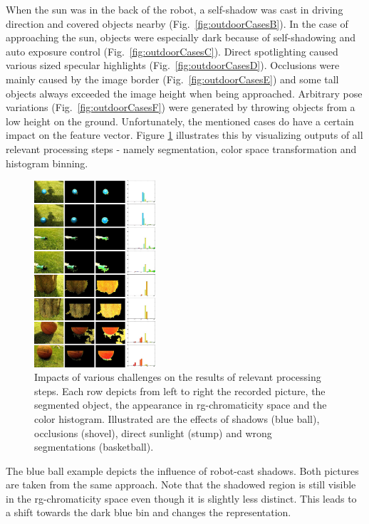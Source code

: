 \documentclass[conference]{IEEEtran}
\begin{document}
When the sun was in the back of the robot, a self-shadow was cast in driving direction and covered objects nearby (Fig.~\ref{fig:outdoorCasesB}). 
In the case of approaching the sun, objects were especially dark because of self-shadowing and auto exposure control (Fig.~\ref{fig:outdoorCasesC}).
Direct spotlighting caused various sized specular highlights (Fig.~\ref{fig:outdoorCasesD}). 
Occlusions were mainly caused by the image border (Fig.~\ref{fig:outdoorCasesE}) and some tall objects always exceeded the image height when being approached.
Arbitrary pose variations (Fig.~\ref{fig:outdoorCasesF}) were generated by throwing objects from a low height on the ground. 
Unfortunately, the mentioned cases do have a certain impact on the feature vector. Figure \ref{fig:featureImpacts} illustrates this by
visualizing outputs of all relevant processing steps - namely segmentation, color space transformation and histogram binning.
\begin{figure}
        \centering
        \includegraphics[width=0.4\textwidth]{Images/Outdoor/Impacts.jpg}
        \caption{Impacts of various challenges on the results of relevant processing steps. 
        Each row depicts from left to right the recorded picture,
        the segmented object, the appearance in rg-chromaticity space and the color histogram. Illustrated are the effects of shadows (blue ball), occlusions (shovel), direct sunlight (stump) 
        and wrong segmentations (basketball).}
        \label{fig:featureImpacts}
\end{figure}
The blue ball example depicts the influence of robot-cast shadows. Both pictures are taken from the same approach.
Note that the shadowed region is still visible in the rg-chromaticity space even though
it is slightly less distinct. This leads to a shift towards the dark blue bin and changes the representation.
\end{document}
